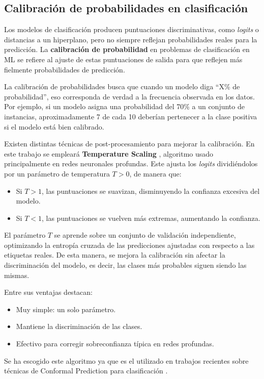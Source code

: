 \subsection{Calibración de probabilidades en clasificación}

Los modelos de clasificación producen puntuaciones discriminativas, como \textit{logits} o distancias a un hiperplano, pero no siempre reflejan probabilidades reales para la predicción. La \textbf{calibración de probabilidad} en problemas de clasificación en \acrshort{ML} se refiere al ajuste de estas puntuaciones de salida para que reflejen más fielmente probabilidades de predicción. 

La calibración de probabilidades busca que cuando un modelo diga ``X\% de probabilidad'', eso corresponda de verdad a la frecuencia observada en los datos. Por ejemplo, si un modelo asigna una probabilidad del 70\% a un conjunto de instancias, aproximadamente 7 de cada 10 deberían pertenecer a la clase positiva si el modelo está bien calibrado.

Existen distintas técnicas de post-procesamiento para mejorar la calibración. En este trabajo se empleará \textbf{Temperature Scaling} \cite{guo2017}, algoritmo usado principalmente en redes neuronales profundas. Este ajusta los \textit{logits} dividiéndolos por un parámetro de temperatura $T>0$, de manera que:
\begin{itemize}
    \item Si $T>1$, las puntuaciones se suavizan, disminuyendo la confianza excesiva del modelo.
    \item Si $T<1$, las puntuaciones se vuelven más extremas, aumentando la confianza.
\end{itemize}
El parámetro $T$ se aprende sobre un conjunto de validación independiente, optimizando la entropía cruzada de las predicciones ajustadas con respecto a las etiquetas reales. De esta manera, se mejora la calibración sin afectar la discriminación del modelo, es decir, las clases más probables siguen siendo las mismas.

Entre sus ventajas destacan:
\begin{itemize}
    \item Muy simple: un solo parámetro.
    \item Mantiene la discriminación de las clases.
    \item Efectivo para corregir sobreconfianza típica en redes profundas.
\end{itemize}

Se ha escogido este algoritmo ya que es el utilizado en trabajos recientes sobre técnicas de Conformal Prediction para clasificación \cite{angelopoulos2020, huang2023conformal}.

